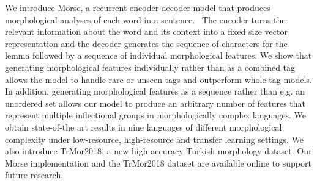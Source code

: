 We introduce Morse, a recurrent encoder-decoder model that produces morphological analyses of each word in a sentence.  The encoder turns the relevant information about the word and its context into a fixed size vector representation and the decoder generates the sequence of characters for the lemma followed by a sequence of individual morphological features. We show that generating morphological features individually rather than as a combined tag allows the model to handle rare or unseen tags and outperform whole-tag models. In addition, generating morphological features as a sequence rather than e.g. an unordered set allows our model to produce an arbitrary number of features that represent multiple inflectional groups in morphologically complex languages. We obtain state-of-the art results in nine languages of different morphological complexity under low-resource, high-resource and transfer learning settings. We also introduce TrMor2018, a new high accuracy Turkish morphology dataset. Our Morse implementation and the TrMor2018 dataset are available online to support future research.